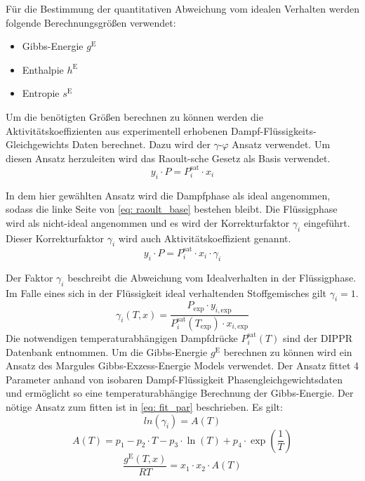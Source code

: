 \documentclass[../thesis.tex]{subfiles}
\begin{document}
Für die Bestimmung der quantitativen Abweichung vom idealen Verhalten werden folgende Berechnungsgrößen verwendet:
\begin{itemize}
	\item Gibbs-Energie $g^{\mathrm{E}}$
	\item Enthalpie $h^{\mathrm{E}}$
	\item Entropie $s^{\mathrm{E}}$
\end{itemize}

Um die benötigten Größen berechnen zu können werden die Aktivitätskoeffizienten aus experimentell erhobenen Dampf-Flüssigkeits-Gleichgewichts Daten berechnet. Dazu wird der $\gamma$-$\varphi$ Ansatz verwendet. Um diesen Ansatz herzuleiten wird das Raoult-sche Gesetz als Basis verwendet.
\begin{equation}
	\label{eq: raoult_base}
	y_i \cdot P = P_{i}^{\mathrm{sat}} \cdot x_i
\end{equation}

In dem hier gewählten Ansatz wird die Dampfphase als ideal angenommen, sodass die linke Seite von \autoref{eq: raoult_base} bestehen bleibt. Die Flüssigphase wird als nicht-ideal angenommen und es wird der Korrekturfaktor $\gamma_i$ eingeführt. Dieser Korrekturfaktor $\gamma_i$ wird auch Aktivitätskoeffizient genannt. 
\begin{equation}
	\label{eq: raoult_mod}
	y_i \cdot P = P_{i}^{\mathrm{sat}} \cdot x_i \cdot \gamma_i
\end{equation}

Der Faktor $\gamma_i$ beschreibt die Abweichung vom Idealverhalten in der Flüssigphase. Im Falle eines sich in der Flüssigkeit ideal verhaltenden Stoffgemisches gilt $\gamma_i = 1$.
\begin{equation}
	\gamma_i \left(T,x \right) = \dfrac{P_{\mathrm{exp}} \cdot y_{i,\mathrm{exp}}}{P_{i}^{\mathrm{sat}}(T_{\mathrm{exp}}) \cdot x_{i,\mathrm{exp}}}
\end{equation}
Die notwendigen temperaturabhängigen Dampfdrücke $P_{i}^{\mathrm{sat}}(T)$ sind der DIPPR Datenbank \cite{thomson1996dippr} entnommen.
Um die Gibbs-Energie $g^{\mathrm{E}}$ berechnen zu können wird ein Ansatz des Margules Gibbs-Exzess-Energie Models verwendet. Der Ansatz fittet 4 Parameter anhand von isobaren Dampf-Flüssigkeit Phasengleichgewichtsdaten und ermöglicht so eine temperaturabhängige Berechnung der Gibbs-Energie. Der nötige Ansatz zum fitten ist in \autoref{eq: fit_par} beschrieben. Es gilt:
\begin{equation}
	\label{eq: fit_par}
	ln(\gamma_i) = A(T)
\end{equation}
\begin{equation}
	A(T) = p_1 - p_2 \cdot T-p_3 \cdot \ln(T)+p_4 \cdot \exp{ \left( \dfrac{1}{T} \right)}
\end{equation}
\begin{equation}
	\dfrac{g^{\mathrm{E}}(T,x)}{RT} = x_1 \cdot x_2 \cdot A(T) 
\end{equation}
\end{document}
